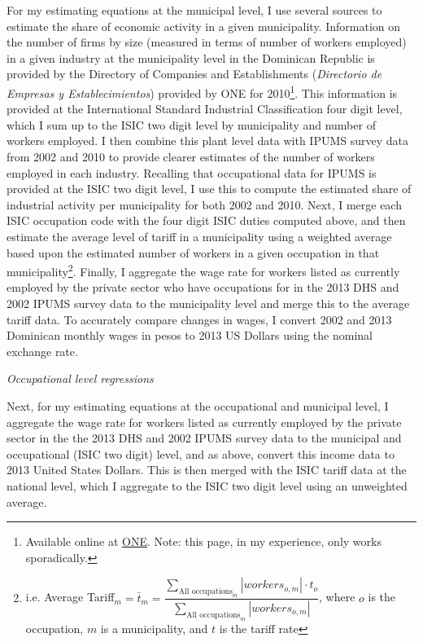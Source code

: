 \documentclass[12pt]{article}
\begin{document}
For my estimating equations at the municipal level,
I use several sources to estimate the share of economic activity in a given municipality.
Information on the number of firms by size (measured in terms of
number of workers employed) in a given industry at the 
municipality level in the Dominican Republic is provided by the 
Directory of Companies and Establishments (\textit{Directorio de Empresas y Establecimientos})
provided by ONE for 2010\footnote{Available online at \href{http://www.one.gov.do/recursos-automatizados/
323/directorio-de-empresas-y-establecimientos/}{ONE}. Note: this page, in my experience,
only works sporadically.}. This information is provided
at the International Standard Industrial Classification four digit level, which I sum
up to the ISIC two digit level by municipality and number of workers employed.
I then combine this plant level data with IPUMS survey data from 2002 and 2010 to provide 
clearer estimates of the number of workers employed in each industry. Recalling that occupational data
for IPUMS is provided at the ISIC two digit level, I use this to compute the estimated
share of industrial activity per municipality for both 2002 and 2010.
Next, I merge each ISIC occupation code with the four digit ISIC duties computed above, 
and then estimate the average level of tariff in a municipality using a weighted average
based upon the estimated number of workers in a given occupation in that 
municipality\footnote{i.e. Average Tariff$_m = \bar{t}_m =
\dfrac{\displaystyle \sum_{\text{All occupations}_m} |workers_{o,m}| \cdot t_o}
{\displaystyle \sum_{\text{All occupations}_m} |workers_{o,m}|}$, where $o$ is the 
occupation, $m$ is a municipality, and $t$ is the tariff rate}. Finally, I aggregate
the wage rate for workers listed as currently employed by the private sector who 
have occupations for in the 2013 DHS 
and 2002 IPUMS survey data to the municipality level and merge
this to the average tariff data. 
To accurately compare changes in wages, I convert 2002 
and 2013 Dominican monthly wages in pesos to 2013 US Dollars using the nominal exchange rate.

\textit{Occupational level regressions}

Next, for my estimating equations at the occupational 
and municipal level, I aggregate the wage rate for workers listed as currently employed 
by the private sector in the the 2013 DHS and 2002 IPUMS survey data to the 
municipal and occupational (ISIC two digit) level, and as above, 
convert this income data to 2013 United States Dollars. 
This is then merged with the ISIC tariff data at the national level, 
which I aggregate to the ISIC two digit level using an unweighted average. 
\end{document}
